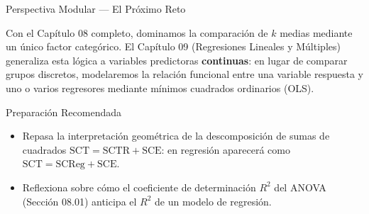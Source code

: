 \documentclass[10pt, aspectratio=169]{beamer}
\begin{document}
\begin{frame}{Perspectiva Modular --- El Próximo Reto}
  \scriptsize
  \begin{retoclase}
    Con el Capítulo 08 completo, dominamos la comparación de $k$ medias mediante un único factor categórico. El Capítulo 09 (Regresiones Lineales y Múltiples) generaliza esta lógica a variables predictoras \textbf{continuas}: en lugar de comparar grupos discretos, modelaremos la relación funcional entre una variable respuesta y uno o varios regresores mediante mínimos cuadrados ordinarios (OLS).
  \end{retoclase}

  \vspace{0.08cm}
  \pause
  \begin{alertblock}{Preparación Recomendada}
    \begin{itemize}\itemsep=0.06cm
      \item Repasa la interpretación geométrica de la descomposición de sumas de cuadrados $\text{SCT}=\text{SCTR}+\text{SCE}$: en regresión aparecerá como $\text{SCT}=\text{SCReg}+\text{SCE}$.
      \item Reflexiona sobre cómo el coeficiente de determinación $R^2$ del ANOVA (Sección 08.01) anticipa el $R^2$ de un modelo de regresión.
    \end{itemize}
  \end{alertblock}
\end{frame}
\end{document}

